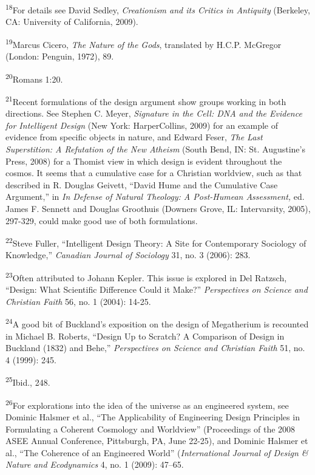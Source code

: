 \textsuperscript{18}For details see David Sedley, \textit{Creationism
and its Critics in Antiquity} (Berkeley, CA: University of California,
2009).


\textsuperscript{19}Marcus Cicero, \textit{The Nature of the Gods},
translated by H.C.P. McGregor (London: Penguin, 1972), 89.


\textsuperscript{20}Romans 1:20.


\textsuperscript{21}Recent formulations of the design argument show
groups working in both directions. See Stephen C. Meyer,
\textit{Signature in the Cell: DNA and the Evidence for Intelligent
Design} (New York: HarperCollins, 2009) for an example of evidence from
specific objects in nature, and Edward Feser, \textit{The Last
Superstition: A Refutation of the New Atheism} (South Bend, IN: St.
Augustine’s Press, 2008) for a Thomist view in which design is evident
throughout the cosmos. It seems that a cumulative case for a Christian
worldview, such as that described in R. Douglas Geivett, “David Hume
and the Cumulative Case Argument,” in \textit{In Defense of Natural
Theology: A Post-Humean Assessment,} ed. James F. Sennett and Douglas
Groothuis (Downers Grove, IL: Intervarsity, 2005), 297-329, could make
good use of both formulations.


\textsuperscript{22}Steve Fuller, “Intelligent Design Theory: A Site for
Contemporary Sociology of Knowledge,” \textit{Canadian Journal of
Sociology} 31, no. 3 (2006): 283.


\textsuperscript{23}Often attributed to Johann Kepler. This issue is
explored in Del Ratzsch, “Design: What Scientific Difference Could it
Make?” \textit{Perspectives on Science and Christian Faith }56, no. 1
(2004): 14-25.


\textsuperscript{24}A good bit of Buckland’s exposition on the design of
Megatherium is recounted in Michael B. Roberts, “Design Up to Scratch?
A Comparison of Design in Buckland (1832) and Behe,”
\textit{Perspectives on Science and Christian Faith} 51, no. 4 (1999):
245.


\textsuperscript{25}Ibid., 248.


\textsuperscript{26}For explorations into the idea of the universe as an
engineered system, see Dominic Halsmer et al., “The Applicability of
Engineering Design Principles in Formulating a Coherent Cosmology and
Worldview” (Proceedings of the 2008 ASEE Annual Conference, Pittsburgh,
PA, June 22-25), and Dominic Halsmer et al., “The Coherence of an
Engineered World” (\textit{International Journal of Design \& Nature
and Ecodynamics }4, no. 1 (2009): 47–65.


